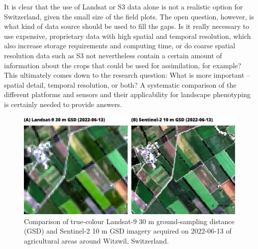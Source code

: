 It is clear that the use of Landsat or \gls{S3} data alone is not a realistic option for Switzerland, given the small size of the field plots. The open question, however, is what kind of data source should be used to fill the gaps. Is it really necessary to use expensive, proprietary data with high spatial and temporal resolution, which also increase storage requirements and computing time, or do coarse spatial resolution data such as \gls{S3} not nevertheless contain a certain amount of information about the crops that could be used for assimilation, for example? This ultimately comes down to the research question: What is more important -- spatial detail, temporal resolution, or both? A systematic comparison of the different platforms and sensors and their applicability for landscape phenotyping is certainly needed to provide answers.

\begin{figure}[H]
    \centering
    \includegraphics[width=\textwidth]{07-Discussion/img/comparison_l9-s2_witzwil22.png}
    \caption{Comparison of true-colour Landsat-9 30 m ground-sampling distance (GSD) and Sentinel-2 10 m GSD imagery acquired on 2022-06-13 of agricultural areas around Witzwil, Switzerland.}
    \label{fig:discussion-l9-vs-s2}
\end{figure}

